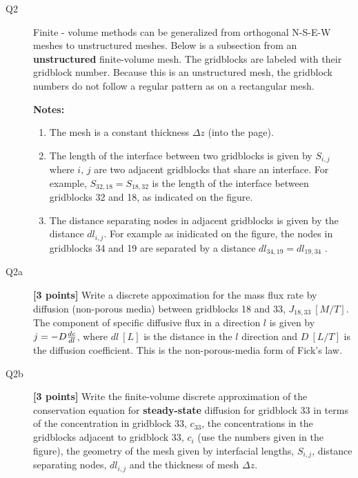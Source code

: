 \documentclass{article}
\begin{document}

\begin{description}
\item [Q2] Finite - volume methods can be generalized from orthogonal N-S-E-W meshes to unstructured meshes. Below is a subsection from an \textbf{unstructured} finite-volume mesh. The gridblocks are labeled with their gridblock number. Because this is an unstructured mesh, the gridblock numbers do not follow a regular pattern as on a rectangular mesh. \par

\item[] \textbf{Notes:}
\begin{enumerate}
\item The mesh is a constant thickness $\Delta z$ (into the page).
\item The length of the interface between two gridblocks is given by $S_{i,j}$ where $i$, $j$ are two adjacent gridblocks that share an interface. For example, $S_{32,18}=S_{18,32}$ is the length of the interface between gridblocks 32 and 18, as indicated on the figure.
\item The distance separating nodes in adjacent gridblocks is given by the distance $dl_{i,j}$. For example as inidicated on the figure, the nodes in gridblocks 34 and 19 are separated by a distance $dl_{34,19}=dl_{19,34}$ .

\end{enumerate}
\item [Q2a] \textbf{[3 points]} Write a discrete appoximation for the mass flux rate by diffusion (non-porous media) between gridblocks 18 and 33, $J_{18,33}~[M/T]$. The component of specific diffusive flux in a direction $l$ is given by $j=-D{dc\over dl}$, where $dl~[L]$ is the distance in the $l$ direction and $D~[L/T]$ is the diffusion coefficient. This is the non-porous-media form of Fick's law.
\vspace{2.0cm}
\item [Q2b] \textbf{[3 points]} Write the finite-volume discrete approximation of the conservation equation for \textbf{steady-state} diffusion for gridblock 33 in terms of the concentration in gridblock 33, $c_{33}$,  the concentrations in the gridblocks adjacent to gridblock 33, $c_i$ (use the numbers given in the figure), the geometry of the mesh given by interfacial lengths, $S_{i,j}$, distance separating nodes, $dl_{i,j}$ and the thickness of mesh $\Delta z$. 

\end{description}
\end{document}
